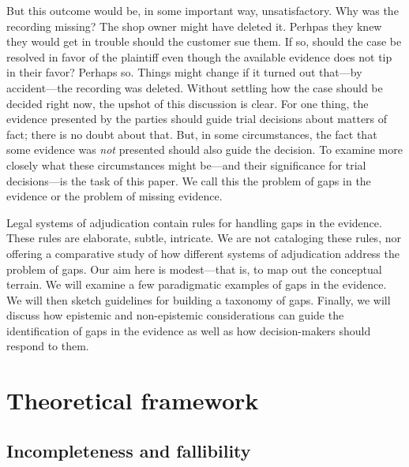 \documentclass[
  10pt,
  dvipsnames,enabledeprecatedfontcommands]{scrartcl}
\begin{document}
But this outcome would be, in some important way, unsatisfactory. Why
was the recording missing? The shop owner might have deleted it. Perhpas
they knew they would get in trouble should the customer sue them. If so,
should the case be resolved in favor of the plaintiff even though the
available evidence does not tip in their favor? Perhaps so. Things might
change if it turned out that---by accident---the recording was deleted.
Without settling how the case should be decided right now, the upshot of
this discussion is clear. For one thing, the evidence presented by the
parties should guide trial decisions about matters of fact; there is no
doubt about that. But, in some circumstances, the fact that some
evidence was \textit{not} presented should also guide the decision. To
examine more closely what these circumstances might be---and their
significance for trial decisions---is the task of this paper. We call
this the problem of gaps in the evidence or the problem of missing
evidence.

Legal systems of adjudication contain rules for handling gaps in the
evidence. These rules are elaborate, subtle, intricate. We are not
cataloging these rules, nor offering a comparative study of how
different systems of adjudication address the problem of gaps. Our aim
here is modest---that is, to map out the conceptual terrain. We will
examine a few paradigmatic examples of gaps in the evidence. We will
then sketch guidelines for building a taxonomy of gaps. Finally, we will
discuss how epistemic and non-epistemic considerations can guide the
identification of gaps in the evidence as well as how decision-makers
should respond to them.

\hypertarget{theoretical-framework}{%
\section{Theoretical framework}\label{theoretical-framework}}

\hypertarget{incompleteness-and-fallibility}{%
\subsection{Incompleteness and
fallibility}\label{incompleteness-and-fallibility}}
\end{document}
